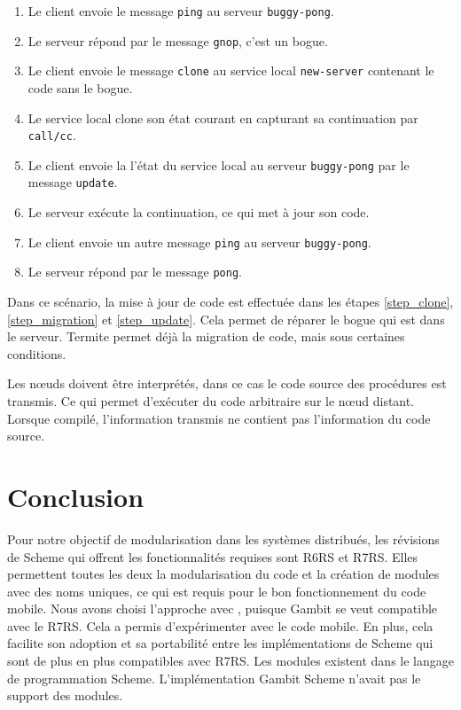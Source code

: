 \begin{enumerate}
  \item Le client envoie le message \texttt{ping} au serveur \texttt{buggy-pong}.
  \item Le serveur répond par le message \texttt{gnop}, c'est un bogue.
  \item Le client envoie le message \texttt{clone} au service local
    \texttt{new-server} contenant le code sans le bogue.

  \item\label{step_clone} Le service local clone son état courant en capturant sa
    continuation par \texttt{call/cc}.

  \item\label{step_migration} Le client envoie la l'état du service local au serveur \texttt{buggy-pong}
    par le message \texttt{update}.

  \item\label{step_update} Le serveur exécute la continuation, ce qui met à jour son code.

  \item Le client envoie un autre message \texttt{ping} au serveur \texttt{buggy-pong}.
  \item Le serveur répond par le message \texttt{pong}.
\end{enumerate}

Dans ce scénario, la mise à jour de code est effectuée dans les étapes
\ref{step_clone}, \ref{step_migration} et \ref{step_update}. Cela
permet de réparer le bogue qui est dans le serveur. Termite permet
déjà la migration de code, mais sous certaines conditions.

Les nœuds doivent être interprétés, dans ce cas le code source des procédures
est transmis. Ce qui permet d'exécuter du code arbitraire sur le nœud distant.
Lorsque compilé, l'information transmis ne contient pas l'information du code
source.

\section{Conclusion}
%
Pour notre objectif de modularisation dans les systèmes distribués, les
révisions de Scheme qui offrent les fonctionnalités requises sont R6RS et R7RS.
Elles permettent toutes les deux la modularisation du code et la création de
modules avec des noms uniques, ce qui est requis pour le bon fonctionnement du
code mobile.   Nous avons choisi l'approche avec ,
puisque Gambit se veut compatible avec le R7RS. Cela a permis d'expérimenter
avec le code mobile. En plus, cela facilite son adoption et sa portabilité
entre les implémentations de Scheme qui sont de plus en plus compatibles avec
R7RS.
Les modules existent dans le langage de programmation Scheme. L'implémentation
Gambit Scheme n'avait pas le support des modules.

